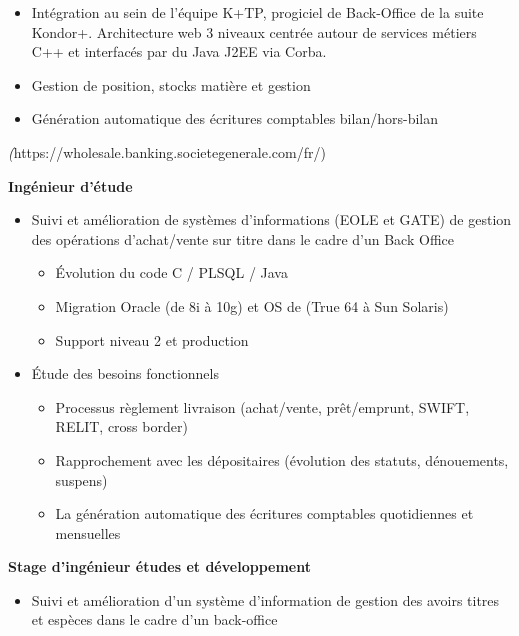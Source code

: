 \documentclass[11pt,a4paper]{moderncv}
\begin{document}
{\bigskip
			\begin{itemize}
				\item Intégration au sein de l’équipe K+TP, progiciel de Back-Office de la suite Kondor+. Architecture web 3 niveaux centrée autour de services métiers C++ et interfacés par du Java J2EE via Corba.
				\item Gestion de position, stocks matière et gestion
				\item Génération automatique des écritures comptables bilan/hors-bilan
			\end{itemize}
}

\newpage

{
	\textit(https://wholesale.banking.societegenerale.com/fr/)

	\bigskip
	\textbf{Ingénieur d'étude}
\bigskip
\begin{itemize}
\item Suivi et amélioration de systèmes d’informations (EOLE et GATE) de gestion des opérations d’achat/vente sur titre dans le cadre d’un Back Office
	\begin{itemize}
		\item Évolution du code C / PLSQL / Java
		\item Migration Oracle (de 8i à 10g) et OS de (True 64 à Sun Solaris)
		\item Support niveau 2 et production
\end{itemize}
\bigskip
\item Étude des besoins fonctionnels
	\begin{itemize}
		\item Processus règlement livraison (achat/vente, prêt/emprunt, SWIFT, RELIT, cross border)
		\item Rapprochement avec les dépositaires (évolution des statuts, dénouements, suspens)
		\item La génération automatique des écritures comptables quotidiennes et mensuelles
	\end{itemize}
\end{itemize}
}
\bigskip
{}
{
\bigskip
\textbf{Stage d’ingénieur études et développement}
\bigskip
\begin{itemize}
	\item Suivi et amélioration d’un système d’information de gestion des avoirs titres et espèces dans le cadre d’un back-office
\end{itemize}
}
\end{document}

